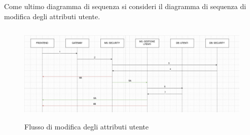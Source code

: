 Come ultimo diagramma di sequenza si consideri il diagramma di sequenza di modifica degli attributi utente.

\begin{center}
    \begin{figure}[h]
        \includegraphics[width=450px, height=180px]{./images/attributi_utente.png}
        \caption{Flusso di modifica degli attributi utente}
        \label{fig:Registration}
    \end{figure}
\end{center}

